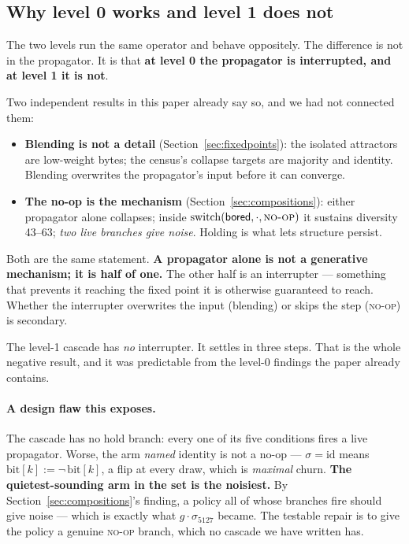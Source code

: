 \documentclass[man,12pt,floatsintext]{apa7}
\newcommand{\sig}{\sigma}
\newcommand{\bit}[1]{\mathrm{bit}[#1]}
\begin{document}
\subsection{Why level 0 works and level 1 does not}

The two levels run the same operator and behave oppositely. The difference is not
in the propagator. It is that \textbf{at level 0 the propagator is interrupted,
and at level 1 it is not}.

Two independent results in this paper already say so, and we had not connected
them:
\begin{itemize}
  \item \textbf{Blending is not a detail} (Section~\ref{sec:fixedpoints}): the
        isolated attractors are low-weight bytes; the census's collapse targets are
        majority and identity. Blending overwrites the propagator's input before it
        can converge.
  \item \textbf{The no-op is the mechanism} (Section~\ref{sec:compositions}):
        either propagator alone collapses; inside
        $\mathrm{switch}(\textsf{bored}, \cdot, \textsc{no-op})$ it sustains
        diversity 43--63; \emph{two live branches give noise}. Holding is what lets
        structure persist.
\end{itemize}
Both are the same statement. \textbf{A propagator alone is not a generative
mechanism; it is half of one.} The other half is an interrupter --- something that
prevents it reaching the fixed point it is otherwise guaranteed to reach. Whether
the interrupter overwrites the input (blending) or skips the step (\textsc{no-op})
is secondary.

The level-1 cascade has \emph{no} interrupter. It settles in three steps. That is
the whole negative result, and it was predictable from the level-0 findings the
paper already contains.

\paragraph{A design flaw this exposes.}
The cascade has no hold branch: every one of its five conditions fires a live
propagator. Worse, the arm \emph{named} $\mathrm{identity}$ is not a no-op ---
$\sig = \mathrm{id}$ means $\bit{k} := \lnot\,\bit{k}$, a flip at every draw, which
is \emph{maximal} churn. \textbf{The quietest-sounding arm in the set is the
noisiest.} By Section~\ref{sec:compositions}'s finding, a policy all of whose
branches fire should give noise --- which is exactly what
$g \cdot \sig_{5127}$ became. The testable repair is to give the policy a genuine
\textsc{no-op} branch, which no cascade we have written has.
\end{document}
